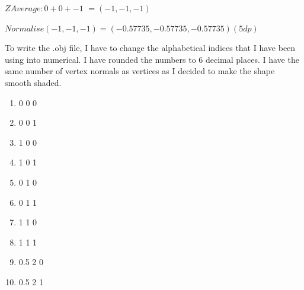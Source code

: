\documentclass[10pt]{report}
\begin{document}
\(Z Average: 0 + 0 + -1\)
\( = (-1,-1,-1)\)

\(Normalise  (-1,-1,-1) = 
(-0.57735, -0.57735, -0.57735) (5dp)\)

To write the .obj file, I have to change the alphabetical indices that I have been using into numerical. I have rounded the numbers to 6 decimal places. I have the same number of vertex normals as vertices as I decided to make the shape smooth shaded. 






\begin{enumerate}[v]
    \item 0 0 0 %
    \item 0 0 1 %
    \item 1 0 0 %
    \item 1 0 1 %
    \item 0 1 0 %
    \item 0 1 1 %
    \item 1 1 0 %
    \item 1 1 1 %
    \item 0.5 2 0 %
    \item 0.5 2 1 %
\end{enumerate}     
%
\end{document}
